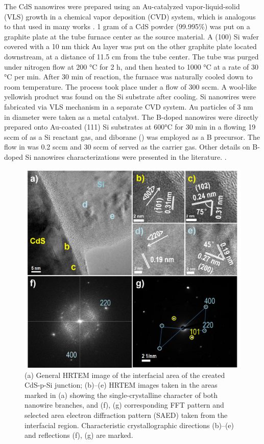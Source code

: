 The CdS nanowires were prepared using an Au-catalyzed vapor-liquid-solid (VLS) growth  in a chemical vapor deposition (CVD) system, which is analogous to that used in many works \cite{zhang2014photosensing,577926461}. 1 gram of a CdS powder (99.995\%) was put on a graphite plate at the tube furnace center as the source material. A (100) Si wafer covered with a 10 nm thick Au layer was put on the other graphite plate located downstream, at a distance of 11.5 cm from the tube center. The tube was purged under nitrogen flow at 200 °C for 2 h, and then heated to 1000 °C at a rate of 30 °C per min. After 30 min of reaction, the furnace was naturally cooled down to room temperature. The process took place under a  flow of 300 sccm. A wool-like yellowish product was found on the Si substrate after cooling. 
Si nanowires were fabricated via VLS mechanism in a separate CVD system. Au particles of 3 nm in diameter were taken as a metal catalyst. The B-doped nanowires were directly prepared onto Au-coated (111) Si substrates at 600°C for 30 min in a flowing 19 sccm of  as a Si reactant gas, and diborane () was employed as a B precursor. The  flow in  was 0.2 sccm and 30 sccm of  served as the carrier gas. Other details on B-doped Si nanowires characterizations were presented in the literature. \cite{577926462,577926464,577926465}.

\begin{figure}  
\includegraphics[width=\textwidth]{figures/figure3_2}
\caption[HRTEM anaysis on junction.]{(a) General HRTEM image of the interfacial area of the created CdS-p-Si junction; (b)–(e) HRTEM images taken in the areas marked in (a) showing the single-crystalline character of both nanowire branches, and (f), (g) corresponding FFT pattern and selected area electron diffraction pattern (SAED) taken from the interfacial region. Characteristic crystallographic directions (b)–(e) and reflections (f), (g) are marked.
\label{fig:fig3_2}}
\end{figure}


